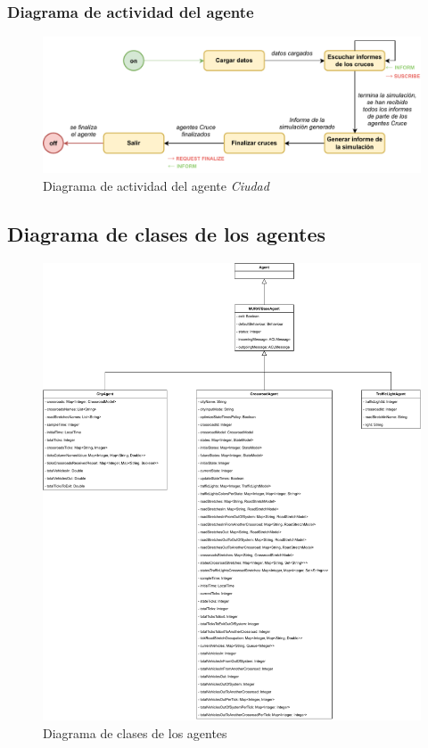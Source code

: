 \subsubsection{Diagrama de actividad del agente}
\begin{figure}[H]
    \centering
    \includegraphics[width=1\linewidth]{text/image/DAgen-DA-City.pdf}
    \caption{Diagrama de actividad del agente \textit{Ciudad}}
    \label{fig:da_agente_ciudad}
\end{figure}

\subsection{Diagrama de clases de los agentes}
\begin{figure}[H]
    \centering
    \includegraphics[width=1\linewidth]{text/image/DAgen-DC.pdf}
    \caption{Diagrama de clases de los agentes}
    \label{fig:dc_agentes}
\end{figure}

